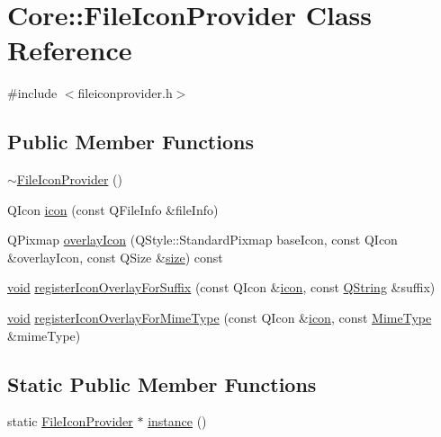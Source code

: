 \hypertarget{class_core_1_1_file_icon_provider}{\section{Core\-:\-:File\-Icon\-Provider Class Reference}
\label{class_core_1_1_file_icon_provider}
}


{\ttfamily \#include $<$fileiconprovider.\-h$>$}

\subsection*{Public Member Functions}
\begin{DoxyCompactItemize}
\item 
\hyperlink{group___core_plugin_gac593ae4c8c40efedf074274bc8638ed7}{$\sim$\-File\-Icon\-Provider} ()
\item 
Q\-Icon \hyperlink{group___core_plugin_ga75107509c65af77e96ab0d2a9f08db73}{icon} (const Q\-File\-Info \&file\-Info)
\item 
Q\-Pixmap \hyperlink{group___core_plugin_ga58fcc29c31f6ae8b15a77a3866601df1}{overlay\-Icon} (Q\-Style\-::\-Standard\-Pixmap base\-Icon, const Q\-Icon \&overlay\-Icon, const Q\-Size \&\hyperlink{glext_8h_a014d89bd76f74ef3a29c8f04b473eb76}{size}) const 
\item 
\hyperlink{group___u_a_v_objects_plugin_ga444cf2ff3f0ecbe028adce838d373f5c}{void} \hyperlink{group___core_plugin_ga9616ec4cd93b85ef72e1a19b150bcdf1}{register\-Icon\-Overlay\-For\-Suffix} (const Q\-Icon \&\hyperlink{group___core_plugin_ga75107509c65af77e96ab0d2a9f08db73}{icon}, const \hyperlink{group___u_a_v_objects_plugin_gab9d252f49c333c94a72f97ce3105a32d}{Q\-String} \&suffix)
\item 
\hyperlink{group___u_a_v_objects_plugin_ga444cf2ff3f0ecbe028adce838d373f5c}{void} \hyperlink{group___core_plugin_ga151216e95f03ddac45c2f705d6459070}{register\-Icon\-Overlay\-For\-Mime\-Type} (const Q\-Icon \&\hyperlink{group___core_plugin_ga75107509c65af77e96ab0d2a9f08db73}{icon}, const \hyperlink{class_core_1_1_mime_type}{Mime\-Type} \&mime\-Type)
\end{DoxyCompactItemize}
\subsection*{Static Public Member Functions}
\begin{DoxyCompactItemize}
\item 
static \hyperlink{class_core_1_1_file_icon_provider}{File\-Icon\-Provider} $\ast$ \hyperlink{group___core_plugin_ga55a436cb128665743dc4a3509672bfb4}{instance} ()
\end{DoxyCompactItemize}


